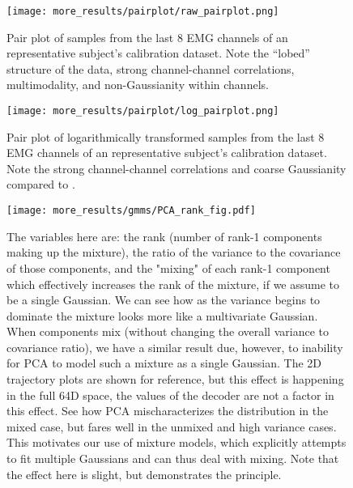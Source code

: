 \documentclass[../main.tex]{subfiles}
\begin{document}
\begin{figure}[!htb]
  \centering
  \texttt{[image: more\_results/pairplot/raw\_pairplot.png]}
  \caption[Pair plot of calibration data]{Pair plot of samples from the last 8 EMG channels of an representative subject's calibration dataset. Note the ``lobed'' structure of the data, strong channel-channel correlations, multimodality, and non-Gaussianity within channels.}\label{fig:raw_pairplot}
\end{figure}

\begin{figure}[!htb]
  \centering
  \texttt{[image: more\_results/pairplot/log\_pairplot.png]}
  \caption[Pair plot of log-transformed calibration data]{Pair plot of logarithmically transformed samples from the last 8 EMG channels of an representative subject's calibration dataset. Note the strong channel-channel correlations and coarse Gaussianity compared to .}\label{fig:log_pairplot}
\end{figure}

\begin{figure}[!htb]
  \centering
    \texttt{[image: more\_results/gmms/PCA\_rank\_fig.pdf]}
    \caption[Toy Mixture Model]{The variables here are: the rank (number of rank-1 components making up the mixture), the ratio of the variance to the covariance of those components, and the "mixing" of each rank-1 component which effectively increases the rank of the mixture, if we assume to be a single Gaussian. We can see how as the variance begins to dominate the mixture looks more like a multivariate Gaussian. When components mix (without changing the overall variance to covariance ratio), we have a similar result due, however, to inability for PCA to model such a mixture as a single Gaussian. The 2D trajectory plots are shown for reference, but this effect is happening in the full 64D space, the values of the decoder are not a factor in this effect. See how PCA mischaracterizes the distribution in the mixed case, but fares well in the unmixed and high variance cases. This motivates our use of mixture models, which explicitly attempts to fit multiple Gaussians and can thus deal with mixing. Note that the effect here is slight, but demonstrates the principle.}\label{fig:toy_model}
\end{figure}
\end{document}
